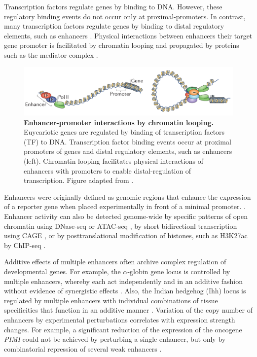 \documentclass[a4paper,twoside=true,openright,parskip=full,chapterprefix=true,11pt,headings=normal,bibliography=totoc,listof=totoc,titlepage=on,captions=tableabove,draft=false]{scrreprt}
\theoremstyle{definition}
\theoremstyle{definition}
\theoremstyle{definition}
\theoremstyle{remark}
\begin{document}
Transcription factors regulate genes by binding to DNA. However, these
regulatory binding events do not occur only at proximal-promoters. In
contrast, many transcription factors regulate genes by binding to distal
regulatory elements, such as enhancers \citep{Spitz2012}. Physical
interactions between enhancers their target gene promoter is facilitated
by chromatin looping and propagated by proteins such as the mediator
complex \citep{Andrey2017}.

\begin{figure}

{\centering \includegraphics[width=0.8\linewidth]{figures/Pombo2015fig1a} 

}

\caption{\textbf{Enhancer-promoter interactions by
chromatin looping.} Euycariotic genes are regulated by binding of
transcription factors (TF) to DNA. Transcription factor binding events
occur at proximal promoters of genes and distal regulatory elements,
such as enhancers (left). Chromatin looping facilitates physical
interactions of enhancers with promoters to enable distal-regulation of
transcription. Figure adapted from \citep{Pombo2015}.}\label{fig:EnhancerLooping}
\end{figure}









Enhancers were originally defined as genomic regions that enhance the
expression of a reporter gene when placed experimentally in front of a
minimal promoter. \citep{Banerji1981, Shlyueva2014}. Enhancer activity
can also be detected genome-wide by specific patterns of open chromatin
using DNase-seq \citep{Song2010} or ATAC-seq \citep{Buenrostro2013}, by
short bidirectionl transcription using CAGE \citep{Andersson2014}, or by
posttranslational modification of histones, such as H3K27ac by ChIP-seq
\citep{Creyghton2010}.

Additive effects of multiple enhancers often archive complex regulation
of developmental genes. For example, the \(\alpha\)-globin gene locus is
controlled by multiple enhancers, whereby each act independently and in
an additive fashion without evidence of synergistic effects
\citep{Hay2016}. Also, the Indian hedgehog (Ihh) locus is regulated by
multiple enhancers with individual combinations of tissue specificities
that function in an additive manner \citep{Will2017}. Variation of the
copy number of enhancers by experimental perturbations correlates with
expression strength changes. For example, a significant reduction of the
expression of the oncogene \emph{PIMI} could not be achieved by
perturbing a single enhancer, but only by combinatorial repression of
several weak enhancers \citep{Xie2017}.
\end{document}
